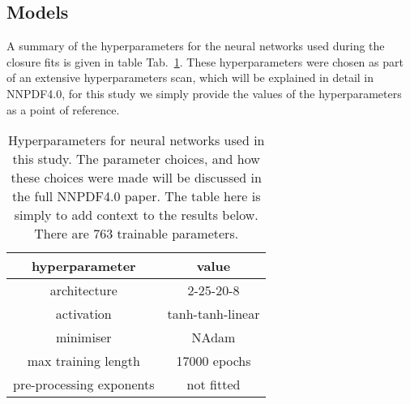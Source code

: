 \subsection{Models}

A summary of the hyperparameters for the neural networks used during the closure
fits is given in table Tab.~\ref{tab:Hyperparams}. These hyperparameters were
chosen as part of an extensive hyperparameters scan, which will be explained in
detail in NNPDF4.0, for this study we simply provide the values of the
hyperparameters as a point of reference.

\begin{table}
    \begin{center}
        \begin{tabular}[h]{c|c}
            \toprule
            hyperparameter & value \\
            \midrule
            architecture & 2-25-20-8 \\
            activation & tanh-tanh-linear \\
            minimiser & NAdam \\
            max training length & 17000 epochs \\
            pre-processing exponents & not fitted \\
            \bottomrule
        \end{tabular}
    \end{center}
    \caption{Hyperparameters for neural networks used in this study. The parameter
    choices, and how these choices were made will be discussed in the full NNPDF4.0
    paper. The table here is simply to add context to the results below. There
    are 763 trainable parameters.}
    \label{tab:Hyperparams}
\end{table}